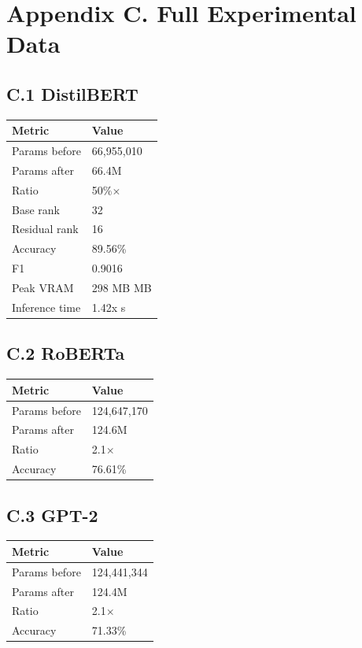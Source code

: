 \section{Appendix C. Full Experimental Data}

\subsection{C.1 DistilBERT}

\begin{table}[H]
\centering
\small
\begin{tabular}{ll}
\toprule
\textbf{Metric} & \textbf{Value} \\
\midrule
Params before & 66,955,010 \\
Params after & 66.4M \\
Ratio & 50\%$\times$ \\
Base rank & 32 \\
Residual rank & 16 \\
Accuracy & 89.56\% \\
F1 & 0.9016 \\
Peak VRAM & 298 MB MB \\
Inference time & 1.42x s \\
\bottomrule
\end{tabular}
\end{table}

\subsection{C.2 RoBERTa}

\begin{table}[H]
\centering
\small
\begin{tabular}{ll}
\toprule
\textbf{Metric} & \textbf{Value} \\
\midrule
Params before & 124,647,170 \\
Params after & 124.6M \\
Ratio & 2.1$\times$ \\
Accuracy & 76.61\% \\
\bottomrule
\end{tabular}
\end{table}

\subsection{C.3 GPT-2}

\begin{table}[H]
\centering
\small
\begin{tabular}{ll}
\toprule
\textbf{Metric} & \textbf{Value} \\
\midrule
Params before & 124,441,344 \\
Params after & 124.4M \\
Ratio & 2.1$\times$ \\
Accuracy & 71.33\% \\
\bottomrule
\end{tabular}
\end{table}

